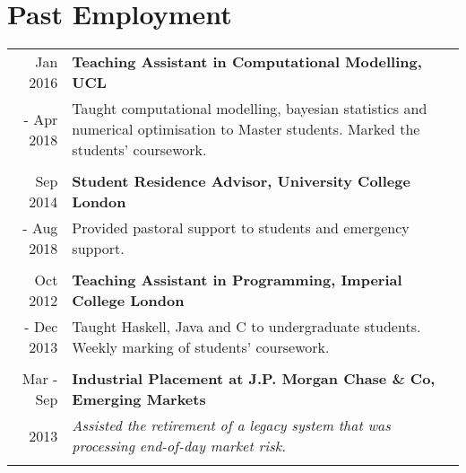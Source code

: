 \documentclass[a4paper,10pt]{article} %
\begin{document}

\section*{Past Employment}



\begin{tabular}{r|p{15cm}}

%


Jan 2016 & \large\textbf{Teaching Assistant in Computational Modelling, UCL} \\
- Apr 2018 & Taught computational modelling, bayesian statistics and numerical optimisation to Master students. Marked the students' coursework.\\
\multicolumn{2}{c}{} \\



Sep 2014 & \large\textbf{Student Residence Advisor, University College London} \\
- Aug 2018 & Provided pastoral support to students and emergency support.\\
\multicolumn{2}{c}{} \\



Oct 2012 & \large\textbf{Teaching Assistant in Programming, Imperial College London} \\
- Dec 2013 & Taught Haskell, Java and C to undergraduate students. Weekly marking of students' coursework.\\
\multicolumn{2}{c}{} \\



Mar - Sep & \large\textbf{Industrial Placement at J.P. Morgan Chase \& Co, Emerging
Markets}\\
2013 & \emph{Assisted the retirement of a legacy system that was processing end-of-day market risk.}\\
\multicolumn{2}{c}{} \\


\end{tabular}
\end{document}
